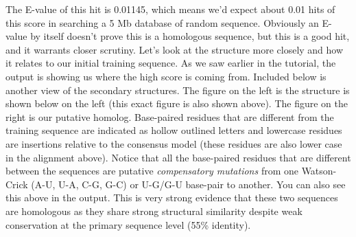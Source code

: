 The E-value of this hit is 0.01145, which means we'd expect about
0.01 hits of this score in searching a 5 Mb database of random
sequence. Obviously an E-value by itself doesn't prove this is a
homologous sequence, but this is a good hit, and it warrants closer
scrutiny. 
Let's look at the structure more closely and how it relates to our
initial training sequence.  As we saw earlier in the tutorial, the
 output is showing us where the high score is coming
from. Included below is another view of the secondary structures.  The
figure on the left is the structure is shown below on the left (this
exact figure is also shown above).  The figure on the right is our
putative homolog.  Base-paired residues that are different from the
training sequence are indicated as hollow outlined letters and
lowercase residues are insertions relative to the consensus model
(these residues are also lower case in the  alignment
above). Notice that all the base-paired residues that are different
between the sequences are putative \emph{compensatory mutations} from
one Watson-Crick (A-U, U-A, C-G, G-C) or U-G/G-U base-pair to
another. You can also see this above in the 
output. This is very strong evidence that these two sequences are
homologous as they share strong structural similarity despite weak
conservation at the primary sequence level (55\% identity).

